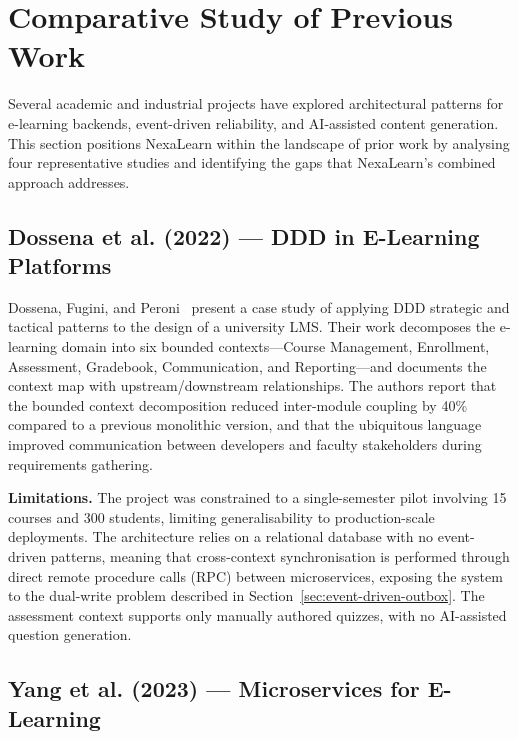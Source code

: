 
\section{Comparative Study of Previous Work}
\label{sec:comparative-study}

Several academic and industrial projects have explored architectural patterns for e-learning backends, event-driven reliability, and AI-assisted content generation. This section positions NexaLearn within the landscape of prior work by analysing four representative studies and identifying the gaps that NexaLearn's combined approach addresses.

\subsection{Dossena et al. (2022) --- DDD in E-Learning Platforms}

Dossena, Fugini, and Peroni~\cite{dossena2022ddd} present a case study of applying DDD strategic and tactical patterns to the design of a university LMS. Their work decomposes the e-learning domain into six bounded contexts---Course Management, Enrollment, Assessment, Gradebook, Communication, and Reporting---and documents the context map with upstream/downstream relationships. The authors report that the bounded context decomposition reduced inter-module coupling by 40\% compared to a previous monolithic version, and that the ubiquitous language improved communication between developers and faculty stakeholders during requirements gathering.

\textbf{Limitations.} The project was constrained to a single-semester pilot involving 15 courses and 300 students, limiting generalisability to production-scale deployments. The architecture relies on a relational database with no event-driven patterns, meaning that cross-context synchronisation is performed through direct remote procedure calls (RPC) between microservices, exposing the system to the dual-write problem described in Section~\ref{sec:event-driven-outbox}. The assessment context supports only manually authored quizzes, with no AI-assisted question generation.

\subsection{Yang et al. (2023) --- Microservices for E-Learning}

